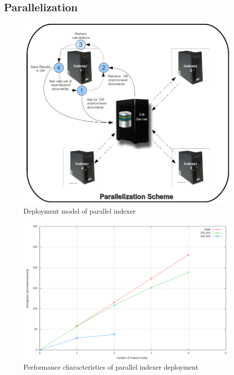 \documentclass[10pt]{report}
\begin{document}
\subsection{Parallelization}
\label{parallelization}

\begin{figure}[p]
  \begin{center}
    \includegraphics[width=\textwidth,height=!]{paralleldeploymentmodel}
  \end{center}
  \caption{Deployment model of parallel indexer} 
  \label{fig:paralleldeploymentmodel}
\end{figure}


\begin{figure}[p]
  \begin{center}
    \includegraphics[width=\textwidth,height=!]{parallelization}
  \end{center}
  \caption{Performance characteristics of parallel indexer deployment} 
  \label{fig:parallelization}
\end{figure} 
\end{document}

